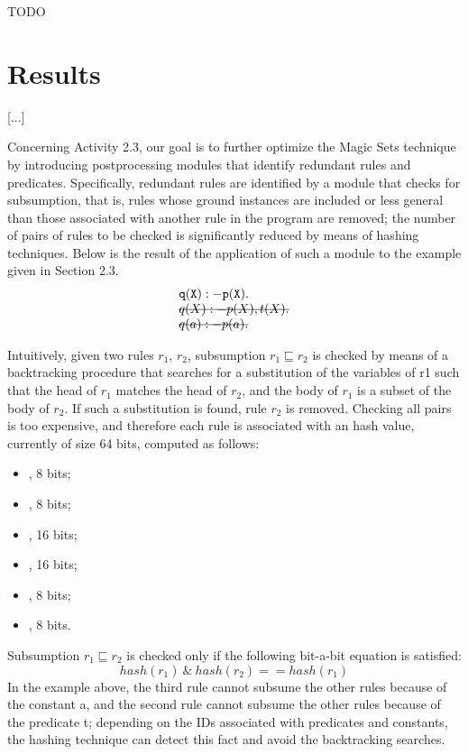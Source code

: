 \documentclass[oneside]{book}
\newcommand{\stkout}[1]{\ifmmode\text{\sout{\ensuremath{#1}}}\else\sout{#1}\fi}
\begin{document}
TODO


\chapter{Results}
[...]

Concerning Activity 2.3, our goal is to further optimize the Magic Sets technique by introducing postprocessing modules that identify redundant rules and predicates. Specifically, redundant rules are identified by a module that checks for subsumption, that is, rules whose ground instances are included or less general than those associated with another rule in the program are removed; the number of pairs of rules to be checked is significantly reduced by means of hashing techniques. Below is the result of the application of such a module to the example given in Section 2.3. 
\[
\begin{array}{l}
{\tt q(X) :- p(X).}\\
\mathtt{\stkout{q(X) :- p(X), t(X).}}\\
\mathtt{\stkout{ q(a) :- p(a).}}\\
\end{array}
\]


Intuitively, given two rules $r_1$, $r_2$, subsumption $r_1 \sqsubseteq r_2$ is checked by means of a backtracking procedure that searches for a substitution of the variables of r1 such that the head of $r_1$ matches the head of $r_2$, and the body of $r_1$ is a subset of the body of $r_2$. If such a substitution is found, rule  $r_2$ is removed. Checking all pairs is too expensive, and therefore each rule is associated with an hash value, currently of size 64 bits, computed as follows:
\begin{itemize}
\item <OR of IDs of head predicates>, 8 bits;
\item <OR of IDs of head constants>, 8 bits;
\item <OR of IDs of predicates in positive body>, 16 bits;
\item <OR of IDs of constants in positive body>, 16 bits;
\item <OR of IDs of predicates in negative body>, 8 bits;
\item <OR of IDs of constants in negative body>, 8 bits.
\end{itemize}
Subsumption $r_1 \sqsubseteq r_2$ is checked only if the following bit-a-bit equation is satisfied:
$$hash(r_1) \ \& \ hash(r_2) == hash(r_1)$$
In the example above, the third rule cannot subsume the other rules because of the constant a, and the second rule cannot subsume the other rules because of the predicate t; depending on the IDs associated with predicates and constants, the hashing technique can detect this fact and avoid the backtracking searches.
\end{document}
